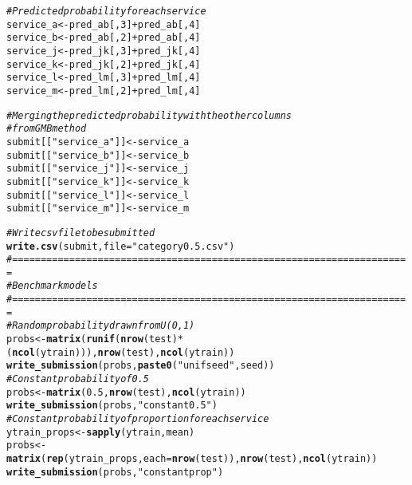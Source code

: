 \documentclass{article}\usepackage[]{graphicx}\usepackage[]{color}
\makeatletter
\newcommand{\hlnum}[1]{\textcolor[rgb]{0.686,0.059,0.569}{#1}}%
\newcommand{\hlstr}[1]{\textcolor[rgb]{0.192,0.494,0.8}{#1}}%
\newcommand{\hlcom}[1]{\textcolor[rgb]{0.678,0.584,0.686}{\textit{#1}}}%
\newcommand{\hlopt}[1]{\textcolor[rgb]{0,0,0}{#1}}%
\newcommand{\hlstd}[1]{\textcolor[rgb]{0.345,0.345,0.345}{#1}}%
\newcommand{\hlkwb}[1]{\textcolor[rgb]{0.69,0.353,0.396}{#1}}%
\newcommand{\hlkwc}[1]{\textcolor[rgb]{0.333,0.667,0.333}{#1}}%
\newcommand{\hlkwd}[1]{\textcolor[rgb]{0.737,0.353,0.396}{\textbf{#1}}}%
\newenvironment{kframe}{%
 \def\at@end@of@kframe{}%
 \ifinner\ifhmode%
  \def\at@end@of@kframe{\end{minipage}}%
  \begin{minipage}{\columnwidth}%
 \fi\fi%
 \def\FrameCommand##1{\hskip\@totalleftmargin \hskip-\fboxsep
 \colorbox{shadecolor}{##1}\hskip-\fboxsep
     \hskip-\linewidth \hskip-\@totalleftmargin \hskip\columnwidth}%
 \MakeFramed {\advance\hsize-\width
   \@totalleftmargin\z@ \linewidth\hsize
   \@setminipage}}%
 {\par\unskip\endMakeFramed%
 \at@end@of@kframe}
\newenvironment{knitrout}{}{} %
\makeatother
\begin{document}
\begin{knitrout}
\begin{kframe}
\begin{alltt}
\hlcom{# Predicted probability for each service}
\hlstd{service_a} \hlkwb{<-} \hlstd{pred_ab[,}\hlnum{3}\hlstd{]} \hlopt{+} \hlstd{pred_ab[,}\hlnum{4}\hlstd{]}
\hlstd{service_b} \hlkwb{<-} \hlstd{pred_ab[,}\hlnum{2}\hlstd{]} \hlopt{+} \hlstd{pred_ab[,}\hlnum{4}\hlstd{]}
\hlstd{service_j} \hlkwb{<-} \hlstd{pred_jk[,}\hlnum{3}\hlstd{]} \hlopt{+} \hlstd{pred_jk[,}\hlnum{4}\hlstd{]}
\hlstd{service_k} \hlkwb{<-} \hlstd{pred_jk[,}\hlnum{2}\hlstd{]} \hlopt{+} \hlstd{pred_jk[,}\hlnum{4}\hlstd{]}
\hlstd{service_l} \hlkwb{<-} \hlstd{pred_lm[,}\hlnum{3}\hlstd{]} \hlopt{+} \hlstd{pred_lm[,}\hlnum{4}\hlstd{]}
\hlstd{service_m} \hlkwb{<-} \hlstd{pred_lm[,}\hlnum{2}\hlstd{]} \hlopt{+} \hlstd{pred_lm[,}\hlnum{4}\hlstd{]}


\hlcom{# Merging the predicted probability with the other columns}
\hlcom{# from GMB method}
\hlstd{submit[[}\hlstr{"service_a"}\hlstd{]]} \hlkwb{<-} \hlstd{service_a}
\hlstd{submit[[}\hlstr{"service_b"}\hlstd{]]} \hlkwb{<-} \hlstd{service_b}
\hlstd{submit[[}\hlstr{"service_j"}\hlstd{]]} \hlkwb{<-} \hlstd{service_j}
\hlstd{submit[[}\hlstr{"service_k"}\hlstd{]]} \hlkwb{<-} \hlstd{service_k}
\hlstd{submit[[}\hlstr{"service_l"}\hlstd{]]} \hlkwb{<-} \hlstd{service_l}
\hlstd{submit[[}\hlstr{"service_m"}\hlstd{]]} \hlkwb{<-} \hlstd{service_m}

\hlcom{# Write csv file to be submitted}
\hlkwd{write.csv}\hlstd{(submit,} \hlkwc{file} \hlstd{=} \hlstr{"category0.5.csv"}\hlstd{)}
\hlcom{#======================================================================}
\hlcom{# Benchmark models}
\hlcom{#======================================================================}
\hlcom{# Random probability drawn from U(0, 1)}
\hlstd{probs} \hlkwb{<-} \hlkwd{matrix}\hlstd{(}\hlkwd{runif}\hlstd{(}\hlkwd{nrow}\hlstd{(test)}\hlopt{*}\hlstd{(}\hlkwd{ncol}\hlstd{(ytrain))),} \hlkwd{nrow}\hlstd{(test),} \hlkwd{ncol}\hlstd{(ytrain))}
\hlkwd{write_submission}\hlstd{(probs,} \hlkwd{paste0}\hlstd{(}\hlstr{"unifseed"}\hlstd{, seed))}
\hlcom{# Constant probability of 0.5}
\hlstd{probs} \hlkwb{<-} \hlkwd{matrix}\hlstd{(}\hlnum{0.5}\hlstd{,} \hlkwd{nrow}\hlstd{(test),} \hlkwd{ncol}\hlstd{(ytrain))}
\hlkwd{write_submission}\hlstd{(probs,} \hlstr{"constant0.5"}\hlstd{)}
\hlcom{# Constant probability of proportion for each service}
\hlstd{ytrain_props} \hlkwb{<-} \hlkwd{sapply}\hlstd{(ytrain, mean)}
\hlstd{probs} \hlkwb{<-} \hlkwd{matrix}\hlstd{(}\hlkwd{rep}\hlstd{(ytrain_props,} \hlkwc{each} \hlstd{=} \hlkwd{nrow}\hlstd{(test)),} \hlkwd{nrow}\hlstd{(test),} \hlkwd{ncol}\hlstd{(ytrain))}
\hlkwd{write_submission}\hlstd{(probs,} \hlstr{"constantprop"}\hlstd{)}
\end{alltt}
\end{kframe}
\end{knitrout}
\end{document}
